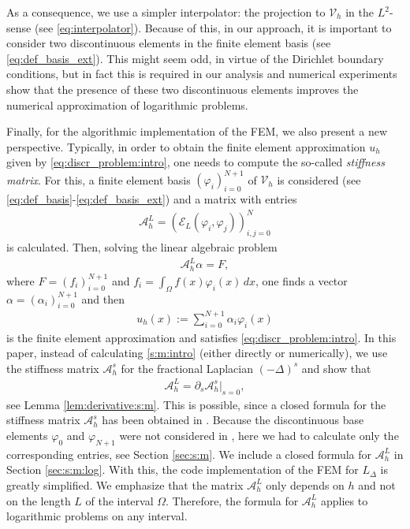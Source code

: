 \documentclass[11 pt]{article}
\numberwithin{equation}{section}
\def\cE{\mathcal{E}}
\begin{document}
 As a consequence, we use a simpler interpolator: the projection to $\mathcal V_h$ in the $L^2$-sense (see \eqref{eq:interpolator}). Because of this, in our approach, it is important to consider two discontinuous elements in the finite element basis (see \eqref{eq:def_basis_ext}).  This might seem odd, in virtue of the Dirichlet boundary conditions, but in fact this is required in our analysis and numerical experiments show that the presence of these two discontinuous elements improves the numerical approximation of logarithmic problems.

 Finally, for the algorithmic implementation of the FEM, we also present a new perspective. Typically, in order to obtain the finite element approximation $u_h$ given by \eqref{eq:discr_problem:intro}, one needs to compute the so-called \emph{stiffness matrix}. For this, a finite element basis $(\varphi_i)_{i=0}^{N+1}$ of $\mathcal V_h$ is considered (see \eqref{eq:def_basis}-\eqref{eq:def_basis_ext}) and a matrix with entries
 \begin{align}\label{s:m:intro}
 \mathcal A_{h}^{L}=(\cE_L(\varphi_i,\varphi_j))_{i,j=0}^N
 \end{align}
 is calculated. Then, solving the linear algebraic problem
 \begin{align*}
\mathcal A_{h}^{L}\alpha = F,
 \end{align*}
 where $F=(f_i)_{i=0}^{N+1}$ and $f_i=\int_{\Omega}f(x)\varphi_i(x)\, dx$, one finds a vector $\alpha=(\alpha_i)_{i=0}^{N+1}$ and then
 \begin{align*}
     u_h(x):=\sum_{i=0}^{N+1}\alpha_i \varphi_i(x)
 \end{align*}
 is the finite element approximation and satisfies \eqref{eq:discr_problem:intro}. In this paper, instead of calculating \eqref{s:m:intro} (either directly or numerically), we use the stiffness matrix $\mathcal A_{h}^{s}$ for the fractional Laplacian $(-\Delta)^s$ and show that
 \begin{align*}
 \mathcal A_{h}^{L}=\partial_s \mathcal A_{h}^{s}|_{s=0},
 \end{align*}
 see Lemma \ref{lem:derivative:s:m}.  This is possible, since a closed formula for the stiffness matrix $\mathcal A_{h}^{s}$ has been obtained in \cite{BH17}.  Because the discontinuous base elements $\varphi_0$ and $\varphi_{N+1}$ were not considered in \cite{BH17}, here we had to calculate only the corresponding entries, see Section \ref{sec:s:m}.  We include a closed formula for $\mathcal A_{h}^{L}$ in Section \ref{sec:s:m:log}.  With this, the code implementation of the FEM for $L_\Delta$ is greatly simplified. We emphasize that the matrix $\mathcal A_{h}^{L}$ only depends on $h$ and not on the length $L$ of the interval $\Omega$.  Therefore, the formula for $\mathcal A_{h}^{L}$ applies to logarithmic problems on any interval.
\end{document}
